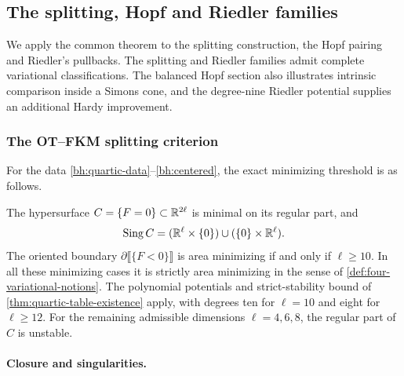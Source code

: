 \subsection{The splitting, Hopf and Riedler families}
\label{sec:quartic-family-completions}

We apply the common theorem to the splitting construction, the Hopf
pairing and Riedler's pullbacks. The splitting and Riedler families
admit complete variational classifications. The balanced Hopf section
also illustrates intrinsic comparison inside a Simons cone, and the
degree-nine Riedler potential supplies an additional Hardy improvement.

\subsubsection{The OT--FKM splitting criterion}

For the data \eqref{bh:quartic-data}--\eqref{bh:centered}, the exact
minimizing threshold is as follows.

\begin{theorem}\label{bh:main}
The hypersurface $C=\{F=0\}\subset\mathbb R^{2\ell}$ is minimal on its
regular part, and
\[
 \operatorname{Sing} C=(\mathbb R^\ell\times\{0\})\cup(\{0\}\times\mathbb R^\ell).
\]
The oriented boundary $\partial\llbracket\{F<0\}\rrbracket$ is
area minimizing if and only if $\ell\geq10$. In all these minimizing
cases it is strictly area minimizing in the sense of
\cref{def:four-variational-notions}. The polynomial potentials and
strict-stability bound of \cref{thm:quartic-table-existence} apply,
with degrees ten for $\ell=10$ and eight for $\ell\geq12$.
For the remaining
admissible dimensions $\ell=4,6,8$, the regular part of $C$ is unstable.
\end{theorem}

\paragraph{Closure and singularities.}


